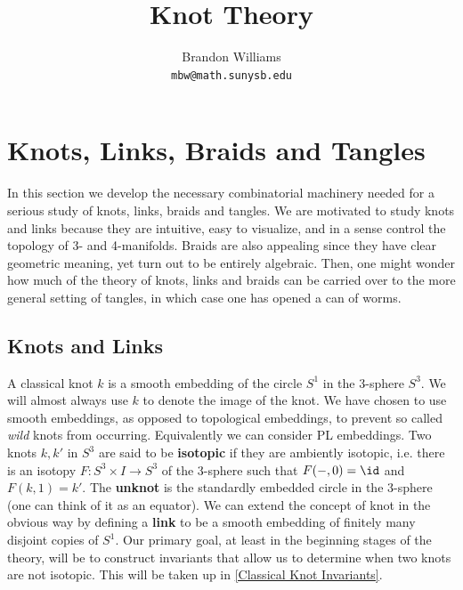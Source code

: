 










\title{\Large Knot Theory}
\author{Brandon Williams \\ \texttt{mbw@math.sunysb.edu}}
\maketitle


\tableofcontents



\newpage
\section{Knots, Links, Braids and Tangles}
\label{Knots, Links, Braids and Tangles}



In this section we develop the necessary combinatorial machinery needed for a serious study of knots, links, braids and tangles. We are motivated to study knots and links because they are intuitive, easy to visualize, and in a sense control the topology of 3- and 4-manifolds. Braids are also appealing since they have clear geometric meaning, yet turn out to be entirely algebraic. Then, one might wonder how much of the theory of knots, links and braids can be carried over to the more general setting of tangles, in which case one has opened a can of worms. 


\subsection{Knots and Links}
\label{Knots and Links}



A classical knot $k$ is a smooth embedding of the circle $S^1$ in the 3-sphere $S^3$. We will almost always use $k$ to denote the image of the knot. We have chosen to use smooth embeddings, as opposed to topological embeddings, to prevent so called \emph{wild} knots from occurring. Equivalently we can consider PL embeddings. Two knots $k,k'$ in $S^3$ are said to be \textbf{isotopic} if they are ambiently isotopic, i.e. there is an isotopy $F : S^3 \times I \rightarrow S^3$ of the 3-sphere such that $F(-,0) = \id$ and $F(k,1) = k'$. The \textbf{unknot} is the standardly embedded circle in the 3-sphere (one can think of it as an equator). We can extend the concept of knot in the obvious way by defining a \textbf{link} to be a smooth embedding of finitely many disjoint copies of $S^1$. Our primary goal, at least in the beginning stages of the theory, will be to construct invariants that allow us to determine when two knots are not isotopic. This will be taken up in \cref{Classical Knot Invariants}.

